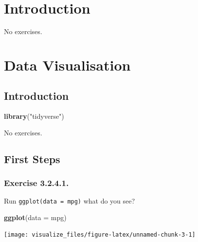 \documentclass[]{book}
\newenvironment{Shaded}{\begin{snugshade}}{\end{snugshade}}
\newcommand{\DataTypeTok}[1]{\textcolor[rgb]{0.13,0.29,0.53}{#1}}
\newcommand{\KeywordTok}[1]{\textcolor[rgb]{0.13,0.29,0.53}{\textbf{#1}}}
\newcommand{\NormalTok}[1]{#1}
\newcommand{\StringTok}[1]{\textcolor[rgb]{0.31,0.60,0.02}{#1}}
\theoremstyle{plain}
\theoremstyle{remark}
\begin{document}
\hypertarget{explore-intro}{%
\chapter{Introduction}\label{explore-intro}}

No exercises.

\hypertarget{data-visualisation}{%
\chapter{Data Visualisation}\label{data-visualisation}}

\hypertarget{introduction-1}{%
\section{Introduction}\label{introduction-1}}

\begin{Shaded}
\begin{Highlighting}[]
\KeywordTok{library}\NormalTok{(}\StringTok{"tidyverse"}\NormalTok{)}
\end{Highlighting}
\end{Shaded}

No exercises.

\hypertarget{first-steps}{%
\section{First Steps}\label{first-steps}}

\hypertarget{exercise-3.2.4.1.}{%
\subsection*{\texorpdfstring{Exercise {3.2.4.1}.}{Exercise 3.2.4.1.}}\label{exercise-3.2.4.1.}}

Run \texttt{ggplot(data\ =\ mpg)} what do you see?

\begin{Shaded}
\begin{Highlighting}[]
\KeywordTok{ggplot}\NormalTok{(}\DataTypeTok{data =}\NormalTok{ mpg)}
\end{Highlighting}
\end{Shaded}

\begin{center}\texttt{[image: visualize\_files/figure-latex/unnamed-chunk-3-1]} \end{center}
\end{document}
